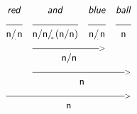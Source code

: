 \documentclass{article}
\newcommand{\deriv}[2]
{  \renewcommand{\arraystretch}{.5}
$\begin{array}[t]{*{#1}{c}}
     #2
   \end{array}$ }
\newcommand{\gf}[1]{\textsf{\textsl{#1}}}
\newcommand{\cf}[1]{\mbox{\ensuremath{\cfont{#1}}}}
\newcommand{\uline}[1]
{\mc{#1}{\hrulefill} }
\newcommand{\mc}[2]
  {\multicolumn{#1}{c}{#2}}
\newcommand{\cfont}{\mathsf}
\newcommand{\subsa}[1]{\hspace{-0.75mm}_{_{#1}}}
\begin{document}
\deriv{4}{
\gf{red} & \gf{and} & \gf{blue} & \gf{ball} \\
\uline{1} & \uline{1} & \uline{1} & \uline{1} \\
\cf{n/ \subsa{.} n} & \cf{n/ n/ \subsa{*} (n/ n)} & \cf{n/ \subsa{.} n} & \cf{n} \\
& \mc{2} {\hrulefill_{>}} \\
& \mc{2}{\cf{n/ n}} \\
& \mc{3} {\hrulefill_{>}} \\
& \mc{3}{\cf{n}} \\
 \mc{4} {\hrulefill_{>}} \\
 \mc{4}{\cf{n}} \\
}

\vspace{5mm}
\end{document}
